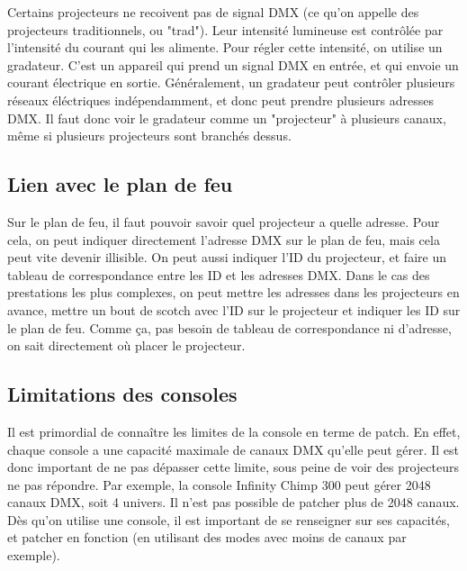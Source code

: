 Certains projecteurs ne recoivent pas de signal DMX (ce qu'on appelle des projecteurs traditionnels, ou "trad"). Leur intensité lumineuse est contrôlée par l'intensité du courant qui les alimente.
Pour régler cette intensité, on utilise un gradateur. C'est un appareil qui prend un signal DMX en entrée, et qui envoie un courant électrique en sortie.
Généralement, un gradateur peut contrôler plusieurs réseaux éléctriques indépendamment, et donc peut prendre plusieurs adresses DMX. Il faut donc voir le gradateur comme un "projecteur" à plusieurs canaux, même si plusieurs projecteurs sont branchés dessus.

\subsection{Lien avec le plan de feu}
\label{subsec:patch_plan_de_feu}

Sur le plan de feu, il faut pouvoir savoir quel projecteur a quelle adresse.
Pour cela, on peut indiquer directement l'adresse DMX sur le plan de feu, mais cela peut vite devenir illisible.
On peut aussi indiquer l'ID du projecteur, et faire un tableau de correspondance entre les ID et les adresses DMX.
\newline
Dans le cas des prestations les plus complexes, on peut mettre les adresses dans les projecteurs en avance, mettre un bout de scotch avec l'ID sur le projecteur et indiquer les ID sur le plan de feu.
Comme ça, pas besoin de tableau de correspondance ni d'adresse, on sait directement où placer le projecteur.

\subsection{Limitations des consoles}
\label{subsec:patch_limitations}

Il est primordial de connaître les limites de la console en terme de patch.
En effet, chaque console a une capacité maximale de canaux DMX qu'elle peut gérer.
Il est donc important de ne pas dépasser cette limite, sous peine de voir des projecteurs ne pas répondre.
\newline
\newline
Par exemple, la console Infinity Chimp 300 peut gérer 2048 canaux DMX, soit 4 univers. Il n'est pas possible de patcher plus de 2048 canaux.
\newline
\newline
Dès qu'on utilise une console, il est important de se renseigner sur ses capacités, et patcher en fonction (en utilisant des modes avec moins de canaux par exemple).
